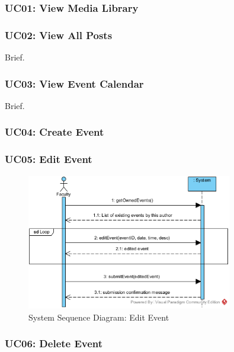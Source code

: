 \documentclass{article}
\begin{document}
\subsubsection{UC01: View Media Library}
\subsubsection{UC02: View All Posts}
Brief.
\subsubsection{UC03: View Event Calendar}
Brief.
\subsubsection{UC04: Create Event}
\subsubsection{UC05: Edit Event}
\begin{figure}[H]
    \centering
    \includegraphics[width=0.8\textwidth]{images/SSD-UC05-EditEvent.png}
    \centering
    \caption{System Sequence Diagram: Edit Event}
\end{figure}
\subsubsection{UC06: Delete Event}
\end{document}
